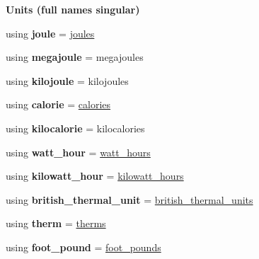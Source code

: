 \begin{Indent}{\bf Units (full names singular)}\par
\begin{DoxyCompactItemize}
\item 
\hypertarget{namespaceunits_1_1energy_a5af9bb1c7eafe86514b342b19e381a5d}{}using {\bfseries joule} = \hyperlink{structunits_1_1unit}{joules}\label{namespaceunits_1_1energy_a5af9bb1c7eafe86514b342b19e381a5d}

\item 
\hypertarget{namespaceunits_1_1energy_a8f28025d219576c588ca41b10294f1d5}{}using {\bfseries megajoule} = megajoules\label{namespaceunits_1_1energy_a8f28025d219576c588ca41b10294f1d5}

\item 
\hypertarget{namespaceunits_1_1energy_a3cc12d57ff7ed10e89c05151b4320d13}{}using {\bfseries kilojoule} = kilojoules\label{namespaceunits_1_1energy_a3cc12d57ff7ed10e89c05151b4320d13}

\item 
\hypertarget{namespaceunits_1_1energy_aa7324c76bcf0e1b28bb7da27aaf46701}{}using {\bfseries calorie} = \hyperlink{structunits_1_1unit}{calories}\label{namespaceunits_1_1energy_aa7324c76bcf0e1b28bb7da27aaf46701}

\item 
\hypertarget{namespaceunits_1_1energy_a9955305e6da72660828276a14c74bbd6}{}using {\bfseries kilocalorie} = kilocalories\label{namespaceunits_1_1energy_a9955305e6da72660828276a14c74bbd6}

\item 
\hypertarget{namespaceunits_1_1energy_a29060c3cccc6d7cbcbd45afe86351fbe}{}using {\bfseries watt\+\_\+hour} = \hyperlink{structunits_1_1unit}{watt\+\_\+hours}\label{namespaceunits_1_1energy_a29060c3cccc6d7cbcbd45afe86351fbe}

\item 
\hypertarget{namespaceunits_1_1energy_a81f47e3cd8066d8f1fb048e57bc8fc08}{}using {\bfseries kilowatt\+\_\+hour} = \hyperlink{structunits_1_1unit}{kilowatt\+\_\+hours}\label{namespaceunits_1_1energy_a81f47e3cd8066d8f1fb048e57bc8fc08}

\item 
\hypertarget{namespaceunits_1_1energy_aac77b3294d64336f04e374a5fd209304}{}using {\bfseries british\+\_\+thermal\+\_\+unit} = \hyperlink{structunits_1_1unit}{british\+\_\+thermal\+\_\+units}\label{namespaceunits_1_1energy_aac77b3294d64336f04e374a5fd209304}

\item 
\hypertarget{namespaceunits_1_1energy_ae36ee2c32819bfd7a307bdaf89bbf6fc}{}using {\bfseries therm} = \hyperlink{structunits_1_1unit}{therms}\label{namespaceunits_1_1energy_ae36ee2c32819bfd7a307bdaf89bbf6fc}

\item 
\hypertarget{namespaceunits_1_1energy_a05b430267fb8ed66215264fd9c0f83f4}{}using {\bfseries foot\+\_\+pound} = \hyperlink{structunits_1_1unit}{foot\+\_\+pounds}\label{namespaceunits_1_1energy_a05b430267fb8ed66215264fd9c0f83f4}

\end{DoxyCompactItemize}
\end{Indent}
